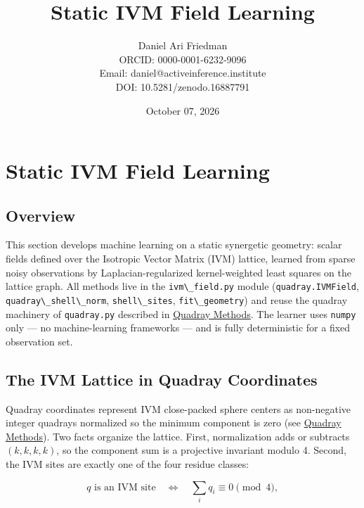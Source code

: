 \documentclass[
  10pt,
]{article}
\title{Static IVM Field Learning}
\author{Daniel Ari Friedman\\ ORCID: 0000-0001-6232-9096\\ Email: daniel@activeinference.institute\\ DOI: 10.5281/zenodo.16887791}
\date{October 07, 2026}
\newcommand{\passthrough}[1]{#1}
\begin{document}
\maketitle

{
\hypersetup{linkcolor=black}
\setcounter{tocdepth}{3}
\tableofcontents
}
\section{Static IVM Field Learning}\label{static-ivm-field-learning}

\subsection{Overview}\label{overview}

This section develops machine learning on a static synergetic geometry:
scalar fields defined over the Isotropic Vector Matrix (IVM) lattice,
learned from sparse noisy observations by Laplacian-regularized
kernel-weighted least squares on the lattice graph. All methods live in
the \passthrough{\lstinline!ivm\_field.py!} module
(\passthrough{\lstinline!quadray.IVMField!},
\passthrough{\lstinline!quadray\_shell\_norm!},
\passthrough{\lstinline!shell\_sites!},
\passthrough{\lstinline!fit\_geometry!}) and reuse the quadray machinery
of \passthrough{\lstinline!quadray.py!} described in
\href{03_quadray_methods.md}{Quadray Methods}. The learner uses
\passthrough{\lstinline!numpy!} only --- no machine-learning frameworks
--- and is fully deterministic for a fixed observation set.

\subsection{The IVM Lattice in Quadray
Coordinates}\label{the-ivm-lattice-in-quadray-coordinates}

Quadray coordinates represent IVM close-packed sphere centers as
non-negative integer quadrays normalized so the minimum component is
zero (see \href{03_quadray_methods.md}{Quadray Methods}). Two facts
organize the lattice. First, normalization adds or subtracts
\((k,k,k,k)\), so the component sum is a projective invariant modulo 4.
Second, the IVM sites are exactly one of the four residue classes:

\begin{equation}
\label{eq:ivm-site-condition}
q \text{ is an IVM site} \quad\Longleftrightarrow\quad \textstyle\sum_i q_i \equiv 0 \pmod{4},
\end{equation}
\end{document}
